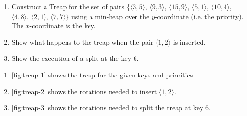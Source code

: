 \exercise

\begin{enumerate}

  \item Construct a Treap for the set of pairs $\big\{ \langle 3, 5 \rangle$,
  $\langle 9, 3 \rangle$, $\langle 15, 9\rangle$, $\langle 5, 1 \rangle$,
  $\langle 10, 4 \rangle$, $\langle 4, 8 \rangle$, $\langle 2, 1 \rangle$,
  $\langle 7, 7 \rangle \big\}$ using a min-heap over the $y$-coordinate (i.e.
  the priority). The $x$-coordinate is the key.

  \item Show what happens to the treap when the pair $\langle 1, 2 \rangle$ is
  inserted.

  \item Show the execution of a split at the key 6.

\end{enumerate}

\solution

\begin{enumerate}

  \item \autoref{fig:treap-1} shows the treap for the given keys and priorities.

  \item \autoref{fig:treap-2} shows the rotations needed to insert $\langle 1, 2
  \rangle$.

  \item \autoref{fig:treap-3} shows the rotations needed to split the treap at
  key 6.

\end{enumerate}

